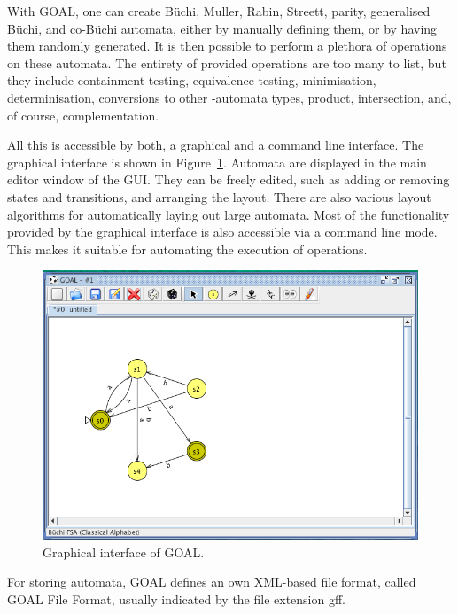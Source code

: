With GOAL, one can create Büchi, Muller, Rabin, Streett, parity, generalised Büchi, and co-Büchi automata, either by manually defining them, or by having them randomly generated. It is then possible to perform a plethora of operations on these automata. The entirety of provided operations are too many to list, but they include containment testing, equivalence testing, minimisation, determinisation, conversions to other \om-automata types, product, intersection, and, of course, complementation.

All this is accessible by both, a graphical and a command line interface. The graphical interface is shown in Figure~\ref{goal_gui}. Automata are displayed in the main editor window of the GUI. They can be freely edited, such as adding or removing states and transitions, and arranging the layout. There are also various layout algorithms for automatically laying out large automata. Most of the functionality provided by the graphical interface is also accessible via a command line mode. This makes it suitable for automating the execution of operations.

\begin{figure}
\begin{center}
\includegraphics[scale=0.5]{figures/goal_gui.png}
\caption{Graphical interface of GOAL.}
\label{goal_gui}
\end{center}
\end{figure} 

For storing automata, GOAL defines an own XML-based file format, called GOAL File Format, usually indicated by the file extension gff.

